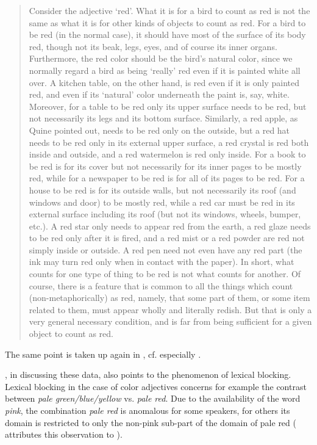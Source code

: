 \begin{quotation}
Consider the adjective `red'. What it is for a bird to count as red is
not the same as what it is for other kinds of objects to count as
red. For a bird to be red (in the normal case), it should have most of
the surface of its body red, though not its beak, legs, eyes, and of
course its inner organs. Furthermore, the red color should be the
bird's natural color, since we normally regard a bird as being
`really' red even if it is painted white all over. A kitchen table, on
the other hand, is red even if it is only painted red, and even if its
`natural' color underneath the paint is, say, white. Moreover, for a
table to be red only its upper surface needs to be red, but not
necessarily its legs and its bottom surface. Similarly, a red apple,
as Quine pointed out, needs to be red only on the outside, but a red
hat needs to be red only in its external upper surface, a red crystal
is red both inside and outside, and a red watermelon is red only
inside. For a book to be red is for its cover but not necessarily for
its inner pages to be mostly red, while for a newspaper to be red is
for all of its pages to be red. For a house to be red is for its
outside walls, but not necessarily its roof (and windows and door) to
be mostly red, while a red car must be red in its external surface
including its roof (but not its windows, wheels, bumper, etc.). A red
star only needs to appear red from the earth, a red glaze needs to be
red only after it is fired, and a red mist or a red powder are red not
simply inside or outside. A red pen need not even have any red part
(the ink may turn red only when in contact with the paper). In short,
what counts for one type of thing to be red is not what counts for
another. Of course, there is a feature that is common to all the things
which count (non-metaphorically) as red, namely, that some part of
them, or some item related to them, must appear wholly and literally
redish. But that is only a very general necessary condition, and is
far from being sufficient for a given object to count as red.\\
\citep[264]{Lahav:1989}
  \end{quotation}
The same point is taken up again in \citet{Lahav:1993}, cf. especially
\citet[76]{Lahav:1993}.
 


\citet{Blutner:1998}, in discussing these data, also points to the phenomenon of lexical blocking. 
Lexical blocking in the case
of color adjectives concerns for example the contrast between \emph{pale
  green/blue/yellow} vs. \emph{pale red}. Due to the availability of
the word \emph{pink}, the combination \emph{pale red} is anomalous for some speakers, for others
its domain is restricted to only the non-pink sub-part of the domain
of pale red (\citealt[123]{Blutner:1998} attributes this observation to \citealt{Householder:1971}). 

